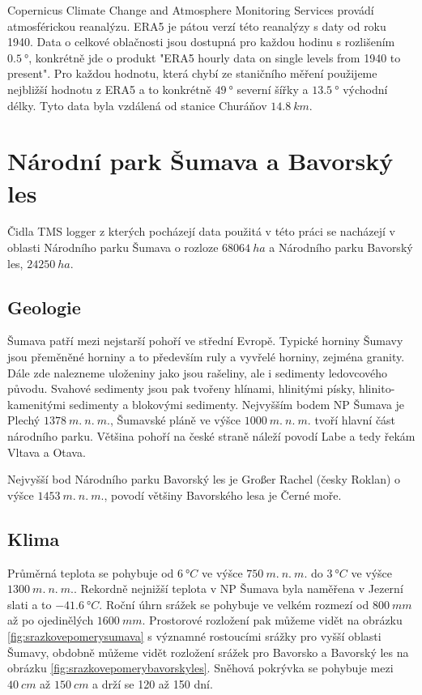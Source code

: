 Copernicus Climate Change and Atmosphere Monitoring Services provádí atmosférickou reanalýzu. ERA5 je pátou verzí této reanalýzy s daty od roku 1940\cite{era5}. Data o celkové oblačnosti jsou dostupná pro každou hodinu s rozlišením $\SI{0.5}{\degree}$, konkrétně jde o produkt "ERA5 hourly data on single levels from 1940 to present". Pro každou hodnotu, která chybí ze staničního měření použijeme nejbližší hodnotu z ERA5 a to konkrétně $\SI{49}{\degree}$ severní šířky a $\SI{13.5}{\degree}$ východní délky. Tyto data byla vzdálená od stanice Churáňov $\SI{14.8}{km}$. 

\section{Národní park Šumava a Bavorský les} \label{chap:sumavabavorskyles}
Čidla TMS logger z kterých pocházejí data použitá v této práci se nacházejí v oblasti Národního parku Šumava o rozloze $\SI{68 064}{ha}$\cite{npsumava} a Národního parku Bavorský les, $\SI{24 250}{ha}$.

\subsection{Geologie}
Šumava patří mezi nejstarší pohoří ve střední Evropě\cite{WildJan2004Cops}. Typické horniny Šumavy jsou přeměněné horniny a to především ruly a vyvřelé horniny, zejména granity. Dále zde nalezneme uloženiny jako jsou rašeliny, ale i sedimenty ledovcového původu. Svahové sedimenty jsou pak tvořeny hlínami, hlinitými písky, hlinito-kamenitými sedimenty a blokovými sedimenty. Nejvyšším bodem NP Šumava je Plechý $\SI{1378}{m.\ n.\ m.}$, Šumavské pláně ve výšce $\SI{1000}{m.\ n.\ m.}$ tvoří hlavní část národního parku\cite{npsumava}. Většina pohoří na české straně náleží povodí Labe a tedy řekám Vltava a Otava.

Nejvyšší bod Národního parku Bavorský les je Großer Rachel (česky Roklan) o výšce $\SI{1453}{m.\ n.\ m.}$, povodí většiny Bavorského lesa je Černé moře.

\subsection{Klima}
Průměrná teplota se pohybuje od $\SI{6}{\degree C}$ ve výšce $\SI{750}{m.\ n.\ m.}$ do $\SI{3}{\degree C}$ ve výšce $\SI{1300}{m.\ n.\ m.}$. Rekordně nejnižší teplota v NP Šumava byla naměřena v Jezerní slati a to $\SI{-41.6}{\degree C}$. Roční úhrn srážek se pohybuje ve velkém rozmezí od $\SI{800}{mm}$ až po ojedinělých $\SI{1600}{mm}$. Prostorové rozložení pak můžeme vidět na obrázku \ref{fig:srazkovepomerysumava} s významné rostoucími srážky pro vyšší oblasti Šumavy, obdobně můžeme vidět rozložení srážek pro Bavorsko a Bavorský les na obrázku \ref{fig:srazkovepomerybavorskyles}. Sněhová pokrývka se pohybuje mezi $\SI{40}{cm}$ až $\SI{150}{cm}$ a drží se 120 až 150 dní\cite{npsumava}.

